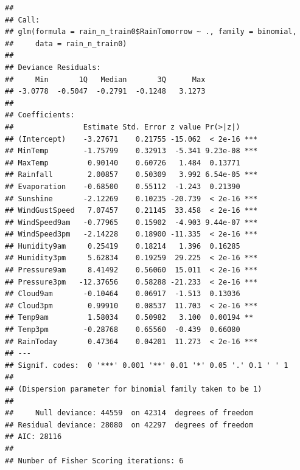 \documentclass[
]{article}
\begin{document}
\begin{verbatim}
## 
## Call:
## glm(formula = rain_n_train0$RainTomorrow ~ ., family = binomial, 
##     data = rain_n_train0)
## 
## Deviance Residuals: 
##     Min       1Q   Median       3Q      Max  
## -3.0778  -0.5047  -0.2791  -0.1248   3.1273  
## 
## Coefficients:
##                Estimate Std. Error z value Pr(>|z|)    
## (Intercept)    -3.27671    0.21755 -15.062  < 2e-16 ***
## MinTemp        -1.75799    0.32913  -5.341 9.23e-08 ***
## MaxTemp         0.90140    0.60726   1.484  0.13771    
## Rainfall        2.00857    0.50309   3.992 6.54e-05 ***
## Evaporation    -0.68500    0.55112  -1.243  0.21390    
## Sunshine       -2.12269    0.10235 -20.739  < 2e-16 ***
## WindGustSpeed   7.07457    0.21145  33.458  < 2e-16 ***
## WindSpeed9am   -0.77965    0.15902  -4.903 9.44e-07 ***
## WindSpeed3pm   -2.14228    0.18900 -11.335  < 2e-16 ***
## Humidity9am     0.25419    0.18214   1.396  0.16285    
## Humidity3pm     5.62834    0.19259  29.225  < 2e-16 ***
## Pressure9am     8.41492    0.56060  15.011  < 2e-16 ***
## Pressure3pm   -12.37656    0.58288 -21.233  < 2e-16 ***
## Cloud9am       -0.10464    0.06917  -1.513  0.13036    
## Cloud3pm        0.99910    0.08537  11.703  < 2e-16 ***
## Temp9am         1.58034    0.50982   3.100  0.00194 ** 
## Temp3pm        -0.28768    0.65560  -0.439  0.66080    
## RainToday       0.47364    0.04201  11.273  < 2e-16 ***
## ---
## Signif. codes:  0 '***' 0.001 '**' 0.01 '*' 0.05 '.' 0.1 ' ' 1
## 
## (Dispersion parameter for binomial family taken to be 1)
## 
##     Null deviance: 44559  on 42314  degrees of freedom
## Residual deviance: 28080  on 42297  degrees of freedom
## AIC: 28116
## 
## Number of Fisher Scoring iterations: 6
\end{verbatim}
\end{document}
